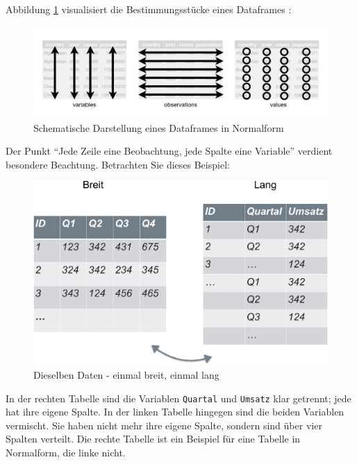 \documentclass[12pt,ngerman,]{book}
\begin{document}
Abbildung \ref{fig:tidy1} visualisiert die Bestimmungsstücke eines
Dataframes \citep{r4ds}:

\begin{figure}

{\centering \includegraphics[width=0.7\linewidth]{images/tidy-1} 

}

\caption{Schematische Darstellung eines Dataframes in Normalform}\label{fig:tidy1}
\end{figure}

Der Punkt ``Jede Zeile eine Beobachtung, jede Spalte eine Variable''
verdient besondere Beachtung. Betrachten Sie dieses Beispiel:

\begin{figure}

{\centering \includegraphics[width=0.7\linewidth]{images/breit_lang} 

}

\caption{Dieselben Daten - einmal breit, einmal lang}\label{fig:lang-breit}
\end{figure}

In der rechten Tabelle sind die Variablen \texttt{Quartal} und
\texttt{Umsatz} klar getrennt; jede hat ihre eigene Spalte. In der
linken Tabelle hingegen sind die beiden Variablen vermischt. Sie haben
nicht mehr ihre eigene Spalte, sondern sind über vier Spalten verteilt.
Die rechte Tabelle ist ein Beispiel für eine Tabelle in Normalform, die
linke nicht.
\end{document}
